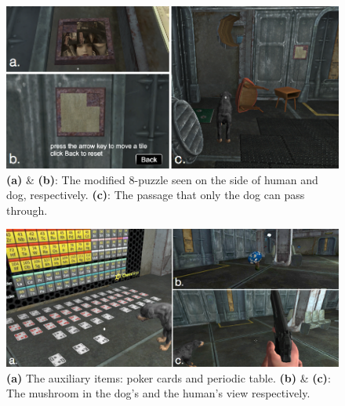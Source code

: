 \documentclass{sigchi}
\begin{document}
\begin{figure}[H]
\centering
\includegraphics[width=0.9\linewidth]{images/puzzle2_all.png}
\caption{\textbf{(a)} \& \textbf{(b)}: The modified 8-puzzle seen on the side of human and dog, respectively. \textbf{(c)}: The passage that only the dog can pass through.}
\label{fig:puzzle2_all}
\end{figure}

\begin{figure}[H]
\centering
\includegraphics[width=0.9\linewidth]{images/puzzle3_and_4.png}
\caption{\textbf{(a)} The auxiliary items: poker cards and periodic table. \textbf{(b)} \& \textbf{(c)}: The mushroom in the dog's and the human's view respectively.}
\label{fig:auxiliaryItems_and_mushrooms}
\end{figure}

\end{document}
